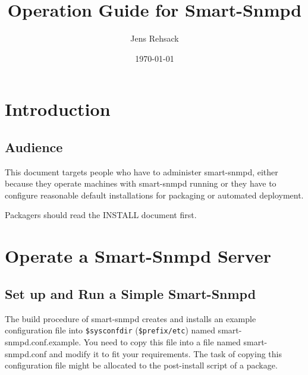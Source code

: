 \usepackage{hyperref}
\usepackage{longtable,tabularx,threeparttable}
\usepackage[dvipsnames,svgnames,table,hyperref]{xcolor}
\usepackage{textcomp}
\usepackage{url,listings}
\usepackage{fancybox}




\title{Operation Guide for Smart-Snmpd}

\author{Jens Rehsack}

\date{\today{}}

\maketitle

\tableofcontents

\section{Introduction}

\subsection{Audience}

This document targets people who have to administer smart-snmpd,
either because they operate machines with smart-snmpd running or they
have to configure reasonable default installations for packaging or
automated deployment.

Packagers should read the INSTALL document first.

\section{Operate a Smart-Snmpd Server}

\subsection{Set up and Run a Simple Smart-Snmpd}

\label{simple-setup}

The build procedure of smart-snmpd creates and installs an example
configuration file into \texttt{\$sysconfdir} (\texttt{\$prefix/etc})
named smart-snmpd.conf.example. You need to copy this file into a file
named smart-snmpd.conf and modify it to fit your requirements. The
task of copying this configuration file might be allocated to the
post-install script of a package.

